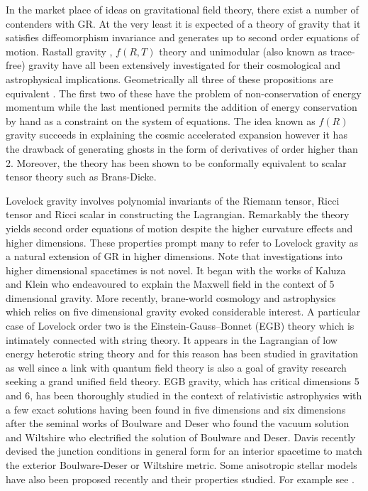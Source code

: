 \documentclass[]{aastex631}
\begin{document}
In the market place of ideas on gravitational field theory, there exist a number of contenders with GR. At the very least it is expected of a theory of gravity that it  satisfies diffeomorphism invariance and  generates up to second order equations of motion. Rastall gravity \citep{rastall1,rastall2,hans1}, $f(R, T)$ theory \citep{Harko,hans2} and unimodular (also known as trace-free) gravity \citep{ellis1,ellis2,hans3} have all been extensively investigated for their cosmological and astrophysical implications. Geometrically all three of these propositions are equivalent \citep{visser,darabi}.  The first two of these have the problem of non-conservation of energy momentum while the last mentioned permits the addition of energy conservation by hand as a constraint on the system of equations. The idea known as $f(R)$ gravity \citep{staro} succeeds in explaining the cosmic accelerated expansion however it has the drawback of generating ghosts in the form of derivatives of order higher than 2. Moreover, the theory has been shown to be conformally equivalent to scalar tensor theory such as Brans-Dicke. 

Lovelock gravity \citep{love1,love2} involves polynomial invariants of the Riemann tensor, Ricci tensor and Ricci scalar in constructing the Lagrangian. Remarkably the theory yields second order equations of motion despite the higher curvature effects and higher dimensions. These properties prompt many to refer to Lovelock gravity as a natural extension of GR in higher dimensions. Note that investigations into higher dimensional spacetimes is not novel. It began with the works of Kaluza \citep{kaluza} and Klein \citep{klein} who endeavoured to explain the Maxwell field in the context of 5 dimensional gravity. More recently,  brane-world cosmology and astrophysics  which relies on five dimensional gravity \citep{maartens} evoked considerable interest.  A particular case of Lovelock order two is the Einstein-Gauss--Bonnet (EGB) theory which is intimately connected with string theory. It appears in the Lagrangian of low energy heterotic string theory \citep{gross} and for this reason has been studied in gravitation as well since a link with quantum field theory is also a goal of gravity research seeking a grand unified field theory. EGB gravity, which has critical dimensions 5 and 6, has been thoroughly studied in the context of relativistic astrophysics with a few exact solutions having been found in five dimensions  \citep{hans4,hans5,hans6,kang} and six dimensions \citep{hans7,hans8}  after the seminal works of Boulware and Deser \citep{boul} who found the vacuum solution and Wiltshire \citep{wilt} who electrified the solution of Boulware and Deser. Davis \citep{davis} recently devised the junction conditions in general form for an interior spacetime to match the exterior Boulware-Deser or Wiltshire metric.  Some anisotropic stellar models have also been proposed recently and their properties studied. For example see \citep{sharif,tangphati,abbas,bhar,pani,Rincon12}. 
\end{document}
